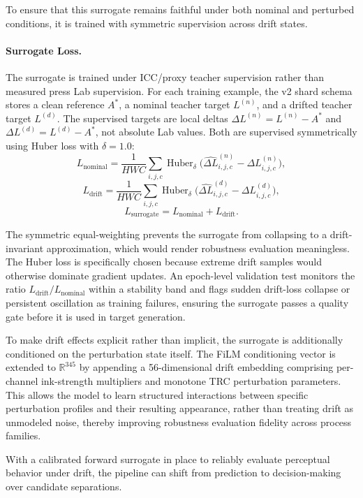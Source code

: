 \documentclass[11pt]{article}
\begin{document}
To ensure that this surrogate remains faithful under both nominal and perturbed conditions, it is trained with symmetric supervision across drift states.

\paragraph{Surrogate Loss.}

The surrogate is trained under ICC/proxy teacher supervision rather than measured press Lab supervision. For each training example, the v2 shard schema stores a clean reference $A^*$, a nominal teacher target $L^{(n)}$, and a drifted teacher target $L^{(d)}$. The supervised targets are local deltas $\Delta L^{(n)}=L^{(n)}-A^*$ and $\Delta L^{(d)}=L^{(d)}-A^*$, not absolute Lab values. Both are supervised symmetrically using Huber loss with $\delta = 1.0$:
\[
L_{\text{nominal}} =
\frac{1}{HWC}\sum_{i,j,c}
\operatorname{Huber}_{\delta}\!\bigl(\widehat{\Delta L}^{(n)}_{i,j,c} - \Delta L^{(n)}_{i,j,c}\bigr),
\]
\[
L_{\text{drift}} =
\frac{1}{HWC}\sum_{i,j,c}
\operatorname{Huber}_{\delta}\!\bigl(\widehat{\Delta L}^{(d)}_{i,j,c} - \Delta L^{(d)}_{i,j,c}\bigr),
\]
\[
L_{\text{surrogate}} = L_{\text{nominal}} + L_{\text{drift}}.
\]

The symmetric equal-weighting prevents the surrogate from collapsing to a drift-invariant approximation, which would render robustness evaluation meaningless. The Huber loss is specifically chosen because extreme drift samples would otherwise dominate gradient updates. An epoch-level validation test monitors the ratio $L_{\text{drift}}/L_{\text{nominal}}$ within a stability band and flags sudden drift-loss collapse or persistent oscillation as training failures, ensuring the surrogate passes a quality gate before it is used in target generation.

To make drift effects explicit rather than implicit, the surrogate is additionally conditioned on the perturbation state itself. The FiLM conditioning vector is extended to $\mathbb{R}^{345}$ by appending a 56-dimensional drift embedding comprising per-channel ink-strength multipliers and monotone TRC perturbation parameters. This allows the model to learn structured interactions between specific perturbation profiles and their resulting appearance, rather than treating drift as unmodeled noise, thereby improving robustness evaluation fidelity across process families.

With a calibrated forward surrogate in place to reliably evaluate perceptual behavior under drift, the pipeline can shift from prediction to decision-making over candidate separations.
\end{document}
